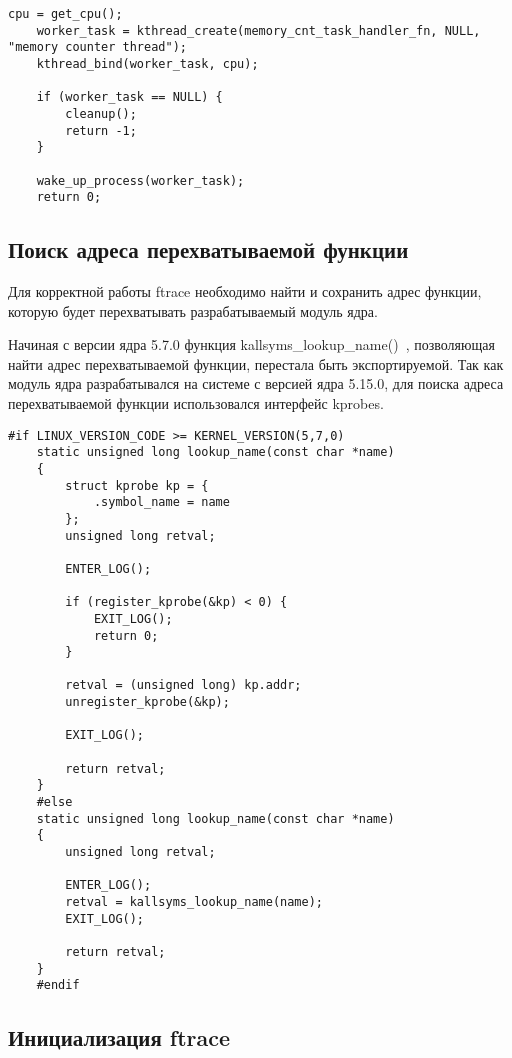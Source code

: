\begin{lstlisting}[label={lst:threadinit}, caption={инициализация потока ядра}]
	cpu = get_cpu();
	worker_task = kthread_create(memory_cnt_task_handler_fn, NULL, "memory counter thread");
	kthread_bind(worker_task, cpu);
	
	if (worker_task == NULL) {
		cleanup();
		return -1;
	}
	
	wake_up_process(worker_task);
	return 0;
\end{lstlisting}

\subsection{Поиск адреса перехватываемой функции}

Для корректной работы ftrace необходимо найти и сохранить адрес функции, которую будет перехватывать разрабатываемый модуль ядра. 

Начиная с версии ядра 5.7.0 функция kallsyms\_lookup\_name()~\cite{kallsyms-removed}, позволяющая найти адрес перехватываемой функции, перестала быть экспортируемой. Так как модуль ядра разрабатывался на системе с версией ядра 5.15.0, для поиска адреса перехватываемой функции использовался интерфейс kprobes.

\begin{lstlisting}[label=lst:lookup_name, caption=Реализация функции lookup\_name()]
	#if LINUX_VERSION_CODE >= KERNEL_VERSION(5,7,0)
	static unsigned long lookup_name(const char *name)
	{
		struct kprobe kp = {
			.symbol_name = name
		};
		unsigned long retval;
		
		ENTER_LOG();
		
		if (register_kprobe(&kp) < 0) {
			EXIT_LOG();
			return 0;
		}
		
		retval = (unsigned long) kp.addr;
		unregister_kprobe(&kp);
		
		EXIT_LOG();
		
		return retval;
	}
	#else
	static unsigned long lookup_name(const char *name)
	{
		unsigned long retval;
		
		ENTER_LOG();
		retval = kallsyms_lookup_name(name);
		EXIT_LOG();
		
		return retval;
	}
	#endif
\end{lstlisting}

\subsection{Инициализация ftrace}

